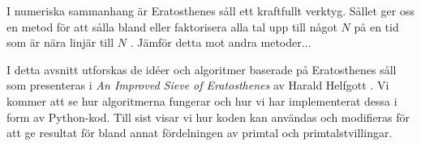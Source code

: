 

I numeriska sammanhang är Eratosthenes såll ett kraftfullt verktyg.
Sållet ger oss en metod för att sålla bland eller faktorisera alla tal upp till något $N$ på en tid som är nära linjär till $N$ \cite[s. 333]{HaraldSieve}.
Jämför detta mot andra metoder...

I detta avsnitt utforskas de idéer och algoritmer baserade på Eratosthenes såll som presenteras i \textit{An Improved Sieve of Eratosthenes} av Harald Helfgott \cite{HaraldSieve}.
Vi kommer att se hur algoritmerna fungerar och hur vi har implementerat dessa i form av Python-kod.
Till sist visar vi hur koden kan användas och modifieras för att ge resultat för bland annat fördelningen av primtal och primtalstvillingar.



